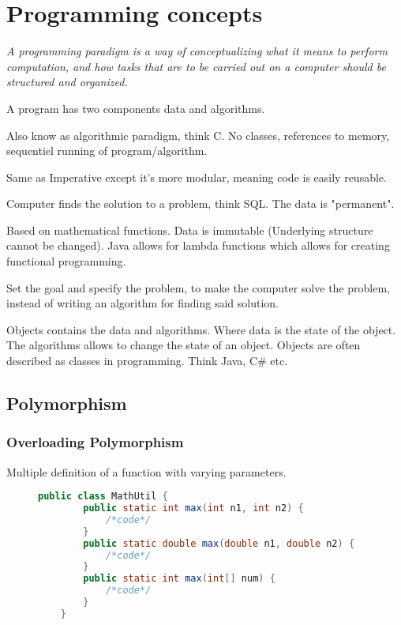\chapter*{Programming concepts}
\begin{center}
    \textit{A programming paradigm is a way of conceptualizing what it means to perform
    computation, and how tasks that are to be carried out on a computer should be structured
    and organized.}
\end{center}

A program has two components data and algorithms.

\begin{list}{paradigm}{0.5cm}
    \item[Imperative paradigm:] Also know as algorithmic paradigm, think C. No classes, references to memory, sequentiel running of program/algorithm.
    \item[Procedural paradigm:] Same as Imperative except it's more modular, meaning code is easily reusable. 
    \item[Declarative paradig:] Computer finds the solution to a problem, think SQL. The data is "permanent".
    \item[Functional paradigm:] Based on mathematical functions. Data is immutable (Underlying structure cannot be changed). Java allows for lambda functions which allows for creating functional programming.
    \item[Logic paradigm:] Set the goal and specify the problem, to make the computer solve the problem, instead of writing an algorithm for finding said solution.
    \item[Object-oriented par:] Objects contains the data and algorithms. Where data is the state of the object. The algorithms allows to change the state of an object. Objects are often described as classes in programming. Think Java, C\# etc.
\end{list}
\clearpage
\section*{Polymorphism}
\subsection*{Overloading Polymorphism}
Multiple definition of a function with varying parameters.
\begin{figure}[h!]
    \begin{lstlisting}[language=Java]
    public class MathUtil {
        public static int max(int n1, int n2) {
            /*code*/
        }
        public static double max(double n1, double n2) {
            /*code*/
        }
        public static int max(int[] num) {
            /*code*/
        }
    }
    \end{lstlisting}
\end{figure}

